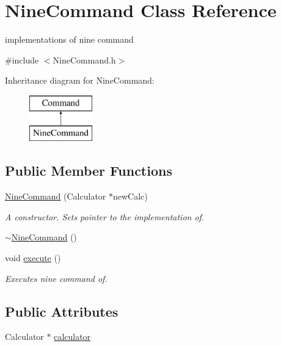 \hypertarget{class_nine_command}{}\section{Nine\+Command Class Reference}
\label{class_nine_command}


implementations of nine command  




{\ttfamily \#include $<$Nine\+Command.\+h$>$}

Inheritance diagram for Nine\+Command\+:\begin{figure}[H]
\begin{center}
\leavevmode
\includegraphics[height=2.000000cm]{class_nine_command}
\end{center}
\end{figure}
\subsection*{Public Member Functions}
\begin{DoxyCompactItemize}
\item 
\hyperlink{class_nine_command_a44f89f6ad7fa2a153d4900ae3553bd68}{Nine\+Command} (Calculator $\ast$new\+Calc)
\begin{DoxyCompactList}\small\item\em A constructor. Sets pointer to the implementation of. \end{DoxyCompactList}\item 
\hyperlink{class_nine_command_a0c5450cc5e1663bdacb821de8c5c94e7}{$\sim$\+Nine\+Command} ()
\item 
void \hyperlink{class_nine_command_a8574ee5eab651afee7426db0fe2cb2f0}{execute} ()
\begin{DoxyCompactList}\small\item\em Executes nine command of. \end{DoxyCompactList}\end{DoxyCompactItemize}
\subsection*{Public Attributes}
\begin{DoxyCompactItemize}
\item 
Calculator $\ast$ \hyperlink{class_nine_command_a3bb8db5764e5c2e3e2025dadf1f81a96}{calculator}
\end{DoxyCompactItemize}


